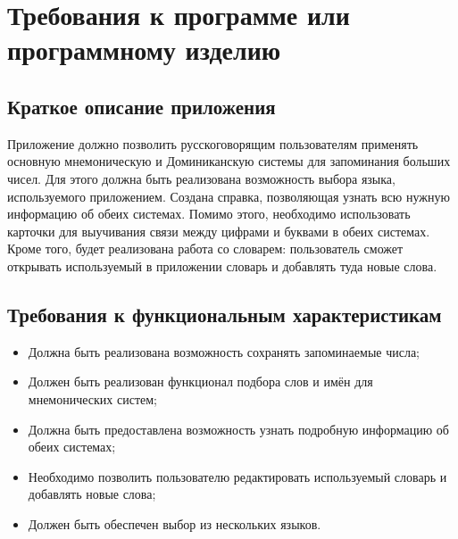 \documentclass[draft]{article}
\begin{document}
\newpage
\section {Требования к программе или программному изделию}
\subsection{Краткое описание приложения}
Приложение должно позволить русскоговорящим пользователям применять основную мнемоническую и Доминиканскую системы для запоминания больших чисел. Для этого должна быть реализована возможность выбора языка, используемого приложением. Создана справка, позволяющая узнать всю нужную информацию об обеих системах. Помимо этого, необходимо использовать карточки для выучивания связи между цифрами и буквами в обеих системах. Кроме того, будет реализована работа со словарем: пользователь сможет открывать используемый в приложении словарь и добавлять туда новые слова.
\subsection{Требования к функциональным характеристикам}
\begin{itemize}
\item Должна быть реализована возможность сохранять запоминаемые числа;
\item Должен быть реализован функционал подбора слов и имён для мнемонических систем;
\item Должна быть предоставлена возможность узнать подробную информацию об обеих системах;
\item Необходимо позволить пользователю редактировать используемый словарь и добавлять новые слова;
\item Должен быть обеспечен выбор из нескольких языков.
\end{itemize}
\end{document}
